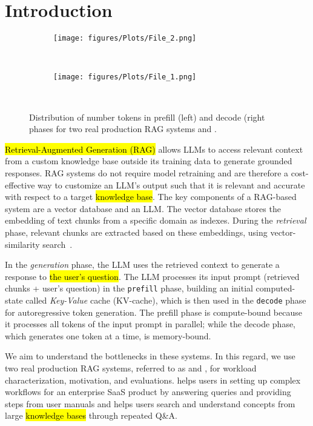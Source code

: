\section{Introduction}
\label{sec:intro}

\begin{figure}[t]
     \centering
        \begin{subfigure}{0.48\linewidth}
         \centering
          \texttt{[image: figures/Plots/File\_2.png]}
         \end{subfigure}~
         \hfill
        \begin{subfigure}{0.48\linewidth}
          \centering
          \texttt{[image: figures/Plots/File\_1.png]}
       \end{subfigure}~
     \caption{Distribution of number tokens in prefill (left)  and decode (right phases for two real production RAG systems \X and \Y.}
     \label{fig:token_dist}
\end{figure}

\hl{Retrieval-Augmented Generation (RAG)} allows LLMs to access relevant context from a custom knowledge base outside its training data to generate grounded responses. 
RAG systems do not require model retraining and are therefore a cost-effective way to customize an LLM's output such that it is relevant and accurate with respect to a target \hl{knowledge base}.
The key components of a RAG-based system are a vector database and an LLM. The vector database stores the embedding of text chunks from a specific domain as indexes. 
During the \textit{retrieval} phase, relevant chunks are extracted based on these embeddings, using vector-similarity search~\cite{echihabi2021new, echihabi2020high}. 

In the \textit{generation} phase, the LLM uses the retrieved context to generate a response to \hl{the user's question}. The LLM processes its input prompt (retrieved chunks + user's question) in the \texttt{prefill} phase, building an initial computed-state called \textit{Key-Value} cache (KV-cache), which is then used in the \texttt{decode} phase for autoregressive token generation. The prefill phase is compute-bound because it processes all tokens of the input prompt in parallel; while the decode phase, which generates one token at a time, is memory-bound.

We aim to understand the bottlenecks in these systems. In this regard, we use two real production RAG systems, referred to as \X and \Y, for workload characterization, motivation, and evaluations.
\X helps users in setting up complex workflows for an enterprise SaaS product by answering queries and providing steps from user manuals and \Y helps users search and understand concepts from large \hl{knowledge bases} through repeated Q\&A.


